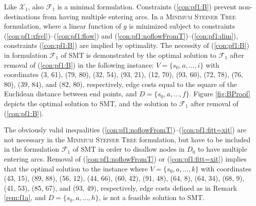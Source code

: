 \begin{remark} \label{rem:f1a}
Like $\mathcal{X}_1$, also $\mathcal{F}_1$ is a minimal formulation.
Constraints (\ref{con:pf1:B}) prevent non-destinations from having multiple entering arcs.
In a \textsc{Minimum Steiner Tree} formulation, where a linear function of $g$ is minimized subject to constraints
(\ref{con:pf1:xfrel})--(\ref{con:pf1:flow}) and (\ref{con:pf1:noflowFromT})--(\ref{con:pf1:dim}),
constraints (\ref{con:pf1:B}) are implied by optimality.
The necessity of (\ref{con:pf1:B}) in formulation $\mathcal{F}_1$ of SMT is demonstrated by the optimal solution to $\mathcal{F}_1$ after removal of (\ref{con:pf1:B})
in the following instance: $V=\{s_0,a,\ldots,i\}$ with coordinates
(3, 61),
(79, 80),
(32, 54),
(93, 21),
(12, 70),
(93, 60),
(72, 78),
(76, 80),
(39, 84), and
(82, 80), respectively, edge costs equal to the square of the Euclidean distance between end points, and $D=\{s_0,a,\ldots,f\}$.
Figure \ref{fig:BProof} depicts the optimal solution to SMT, and the solution to $\mathcal{F}_1$ after removal of (\ref{con:pf1:B}).
\end{remark}
\begin{remark} \label{rem:f1b}
The obviously valid inequalities (\ref{con:pf1:noflowFromT})--(\ref{con:pf1:fitt=xit}) are not necessary in the \textsc{Minimum Steiner Tree} formulation,
but have to be included in the formulation $\mathcal{F}_1$ of SMT in order to disallow nodes in $D_0$ to have multiple entering arcs.
Removal of (\ref{con:pf1:noflowFromT}) or (\ref{con:pf1:fitt=xit}) implies that the optimal solution to the instance where
$V=\{s_0,a,\ldots,k\}$ with coordinates
(43, 15),
(89, 88),
(56, 12),
(44, 66),
(60, 42),
(91, 48),
(64, 8),
(64, 34),
(68, 9),
(41, 53),
(85, 67), and
(93, 49), respectively,
edge costs defined as in Remark \ref{rem:f1a}, and $D=\{s_0,a,\ldots,h\}$,
is not a feasible solution to SMT.
\end{remark}


